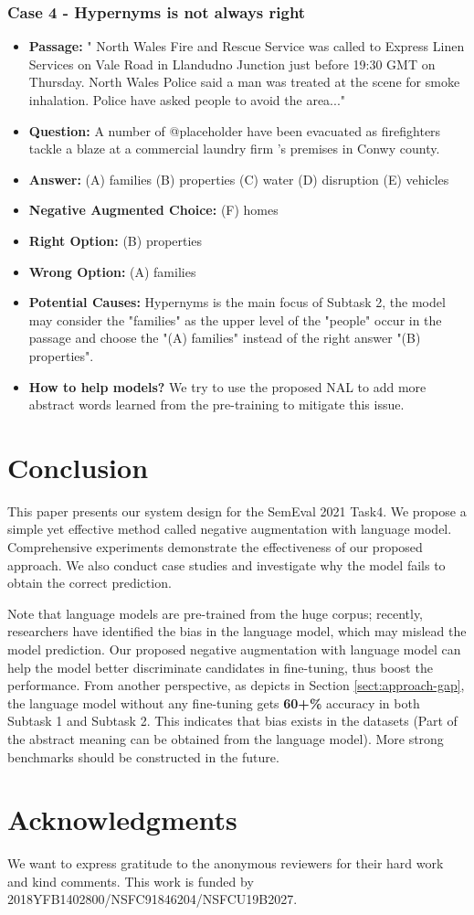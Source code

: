 \documentclass[11pt,a4paper]{article}
\begin{document}
\subsubsection*{Case 4 - Hypernyms is not always right}
\begin{itemize}
\setlength{\itemsep}{0pt}
\setlength{\parsep}{0pt}
\setlength{\parskip}{0pt}
    \item \textbf{Passage:} " North Wales Fire and Rescue Service was called to Express Linen Services on Vale Road in Llandudno Junction just before 19:30 GMT on Thursday. North Wales Police said a man was treated at the scene for smoke inhalation. Police have asked people to avoid the area..."
    \item \textbf{Question:} A number of @placeholder have been evacuated as firefighters tackle a blaze at a commercial laundry firm 's premises in Conwy county.
    \item \textbf{Answer:} (A) families (B) properties (C) water (D) disruption (E) vehicles
    \item \textbf{Negative Augmented Choice:} (F) homes 
    \item \textbf{Right Option:} (B) properties
    \item \textbf{Wrong Option:} (A) families
    \item \textbf{Potential Causes:} Hypernyms is the main focus of Subtask 2, the model may consider the "families" as the upper level of the "people" occur in the passage and choose the "(A) families" instead of the right answer "(B) properties".
    \item\textbf{How to help models?} We try to use the proposed NAL to add more abstract words learned from the pre-training to mitigate this issue.
\end{itemize}

\section{Conclusion}
This paper presents our system design for the SemEval 2021 Task4.
We propose a simple yet effective method called negative augmentation with language model.  
Comprehensive experiments demonstrate the effectiveness of our proposed approach. We also conduct case studies and investigate why the model fails to obtain the correct prediction. 

Note that language models are pre-trained from the huge corpus; recently, researchers have identified the bias in the language model, which may mislead the model prediction. 
Our proposed negative augmentation with language model can help the model better discriminate candidates in fine-tuning, thus boost the performance.
From another perspective, as depicts in Section \ref{sect:approach-gap}, the language model without any fine-tuning gets \textbf{60+\%} accuracy in both Subtask 1 and Subtask 2.
This indicates that bias exists in the datasets (Part of the abstract meaning can be obtained from the language model).
More strong benchmarks should be constructed in the future. 

\section{Acknowledgments}
We  want to express gratitude to the anonymous reviewers for their hard work and kind comments. This work is funded by 2018YFB1402800/NSFC91846204/NSFCU19B2027.




\end{document}
